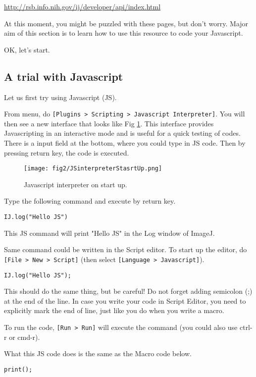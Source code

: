 \documentclass[11pt,a4paper,oneside]{report}
\newcommand{\ijmenu}[1]{\texttt{\small#1}}
\begin{document}
\url{http://rsb.info.nih.gov/ij/developer/api/index.html}

At this moment, you might be puzzled with these pages, 
but don't worry. Major aim of this section is to learn how to use this resource 
to code your Javascript. 

OK, let's start. 

\subsection{A trial with Javascript}
%
Let us first try using Javascript (JS). 

From menu, do \ijmenu{[Plugins > Scripting > Javascript Interpreter]}. 
You will then see a new interface that looks like Fig \ref{fig:JSinterpreter}. 
This interface provides Javascripting in an interactive mode and is useful for 
a quick testing of codes. There is a input field at the bottom, where you could type in JS code. 
Then by pressing return key, the code is executed.  

\begin{figure}[htbp]
\begin{center}
\texttt{[image: fig2/JSinterpreterStasrtUp.png]}
\caption{Javascript interpreter on start up.}
\label{fig:JSinterpreter}
\end{center}
\end{figure} 

Type the following command and execute by return key. 
\begin{lstlisting}[numbers=none]
IJ.log("Hello JS")
\end{lstlisting}
This JS command will print "Hello JS" in the Log window of ImageJ.  

Same command could be written in the Script editor. To start up the editor, 
do \ijmenu{[File > New > Script]} (then select \ijmenu{[Language > Javascript]}). 
\begin{lstlisting}[numbers=none]
IJ.log("Hello JS");
\end{lstlisting}
This should do the same thing, but be careful! Do not forget adding semicolon
(;) at the end of the line. In case you write your code in Script Editor, you need
to explicitly mark the end of line, just like you do when you write a macro.

To run the code, \ijmenu{[Run > Run]} will execute the command (you could also
use ctrl-r or cmd-r). 

What this JS code does is the same as the Macro code below. 
\begin{lstlisting}[numbers=none]
print();
\end{lstlisting}
\end{document}
